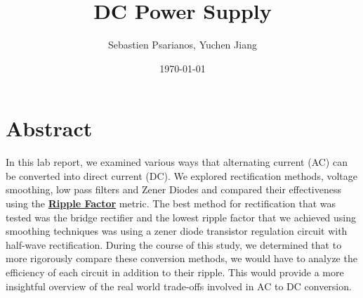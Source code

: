 \documentclass[
	letterpaper
	12pt
]{template}
\title{DC Power Supply}
\author{Sebastien Psarianos, Yuchen Jiang}
\date{\today}
\newcommand{\bref}[2]{\textbf{\hyperref[#1]{#2}}}
\begin{document}
\maketitle
\section{Abstract}
In this lab report, we examined various ways that alternating current (AC) can be converted into direct current (DC). We explored rectification methods, voltage
smoothing, low pass filters and Zener Diodes and compared their effectiveness using the \bref{eqn::ripple}{Ripple Factor} metric. The best method for rectification that was tested was the bridge rectifier and the lowest ripple factor that we achieved using smoothing techniques was using a zener diode transistor regulation circuit with half-wave rectification. During the course of this study, we determined that to more rigorously compare these conversion methods, we would have to analyze the efficiency of each circuit in addition to their ripple. This would provide a more insightful overview of the real world trade-offs involved in AC to DC conversion.
\end{document}

